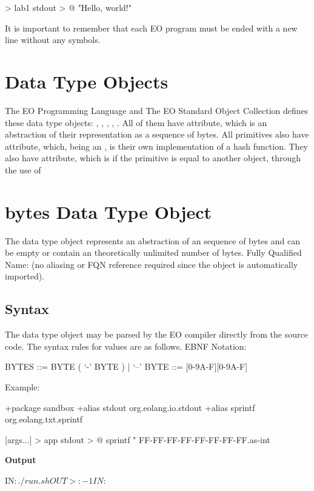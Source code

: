 \documentclass[12pt]{book}
\begin{document}
{\begin{ffcode}
[args...] > lab1
  stdout > @
    "Hello, world!"
\end{ffcode}

It is important to remember that each EO program must be ended with a new line without any symbols.


\section{Data Type Objects}

The EO Programming Language and The EO Standard Object Collection defines these data type objects: , , , , . All of them have  attribute, which is an abstraction of their representation as a sequence of bytes.
All primitives also have  attribute, which, being an , is their own implementation of a hash function. They also have  attribute, which is  if the primitive is equal to another object, through the use of 

\section{bytes Data Type Object}
The  data type object represents an abstraction of an sequence of bytes and can be empty or contain an theoretically unlimited number of bytes.
Fully Qualified Name:  (no aliasing or FQN reference required since the object is automatically imported).

\subsection{Syntax}
The  data type object may be parsed by the EO compiler directly from the source code. The syntax rules for  values are as follows.
EBNF Notation:
\begin{ffcode}
    BYTES   ::= BYTE ( ‘-’ BYTE ) | ‘--’
    BYTE    ::= [0-9A-F][0-9A-F]
\end{ffcode}
Example:
\begin{ffcode}
+package sandbox
+alias stdout org.eolang.io.stdout
+alias sprintf org.eolang.txt.sprintf

[args...] > app
  stdout > @
    sprintf
      "%
      FF-FF-FF-FF-FF-FF-FF-FF.as-int
\end{ffcode}  
\textbf{Output}
\begin{ffcode}
IN$: ./run.sh
OUT>: -1
IN$: 
\end{ffcode}

}
\end{document}
